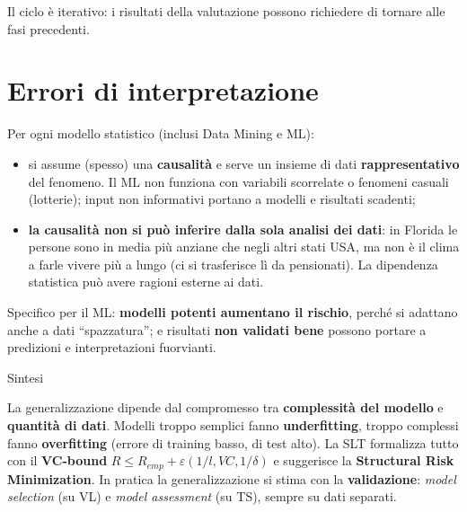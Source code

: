 Il ciclo è iterativo: i risultati della valutazione possono richiedere
di tornare alle fasi precedenti.

\section{Errori di interpretazione}\label{errori-di-interpretazione}

Per ogni modello statistico (inclusi Data Mining e ML):

\begin{itemize}
\tightlist
\item
  si assume (spesso) una \textbf{causalità} e serve un insieme di dati
  \textbf{rappresentativo} del fenomeno. Il ML non funziona con
  variabili scorrelate o fenomeni casuali (lotterie); input non
  informativi portano a modelli e risultati scadenti;
\item
  \textbf{la causalità non si può inferire dalla sola analisi dei dati}:
  in Florida le persone sono in media più anziane che negli altri stati
  USA, ma non è il clima a farle vivere più a lungo (ci si trasferisce
  lì da pensionati). La dipendenza statistica può avere ragioni esterne
  ai dati.
\end{itemize}

Specifico per il ML: \textbf{modelli potenti aumentano il rischio},
perché si adattano anche a dati ``spazzatura''; e risultati \textbf{non
validati bene} possono portare a predizioni e interpretazioni
fuorvianti.

\begin{boxabstract}{Sintesi}

La generalizzazione dipende dal compromesso tra \textbf{complessità del
modello} e \textbf{quantità di dati}. Modelli troppo semplici fanno
\textbf{underfitting}, troppo complessi fanno \textbf{overfitting}
(errore di training basso, di test alto). La SLT formalizza tutto con il
\textbf{VC-bound} \(R \le R_{emp} + \varepsilon(1/l, VC, 1/\delta)\) e
suggerisce la \textbf{Structural Risk Minimization}. In pratica la
generalizzazione si stima con la \textbf{validazione}: \emph{model
selection} (su VL) e \emph{model assessment} (su TS), sempre su dati
separati.

\end{boxabstract}

